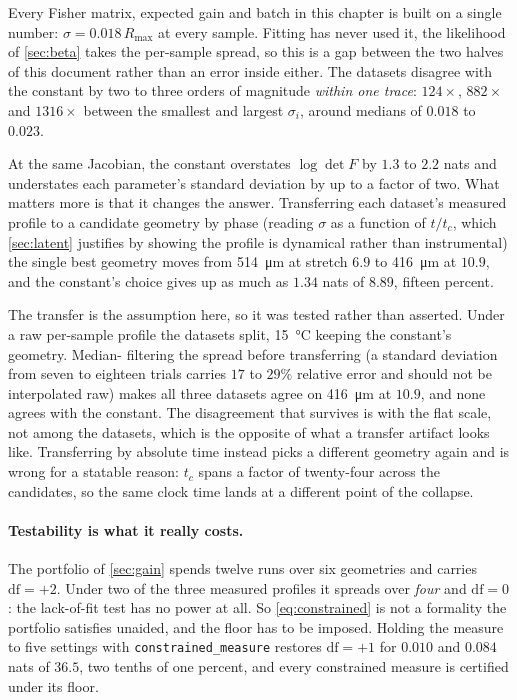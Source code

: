 \documentclass[10pt]{article}
\begin{document}
Every Fisher matrix, expected gain and batch in this chapter is built on a single number:
$\sigma = 0.018\,R_{\max}$ at every sample. Fitting has never used it, the likelihood of
\cref{sec:beta} takes the per-sample spread, so this is a gap between the two halves of this
document rather than an error inside either. The datasets disagree with the constant by two to
three orders of magnitude \emph{within one trace}: $124\times$, $882\times$ and $1316\times$
between the smallest and largest $\sigma_i$, around medians of $0.018$ to $0.023$.

At the same Jacobian, the constant overstates $\log\det F$ by $1.3$ to $2.2$ nats and understates
each parameter's standard deviation by up to a factor of two. What matters more is that it
changes the answer. Transferring each dataset's measured profile to a candidate geometry by phase (reading $\sigma$ as a function of $t/t_c$, which \cref{sec:latent} justifies by showing the
profile is dynamical rather than instrumental) the single best geometry moves from
\SI{514}{\micro\metre} at stretch $6.9$ to \SI{416}{\micro\metre} at $10.9$, and the constant's
choice gives up as much as $1.34$ nats of $8.89$, fifteen percent.

The transfer is the assumption here, so it was tested rather than asserted. Under a raw
per-sample profile the datasets split, \SI{15}{\celsius} keeping the constant's geometry. Median-
filtering the spread before transferring (a standard deviation from seven to eighteen trials
carries $17$ to $29\%$ relative error and should not be interpolated raw) makes all three
datasets agree on \SI{416}{\micro\metre} at $10.9$, and none agrees with the constant. The
disagreement that survives is with the flat scale, not among the datasets, which is the opposite
of what a transfer artifact looks like. Transferring by absolute time instead picks a different
geometry again and is wrong for a statable reason: $t_c$ spans a factor of twenty-four across
the candidates, so the same clock time lands at a different point of the collapse.

\paragraph{Testability is what it really costs.}
The portfolio of \cref{sec:gain} spends twelve runs over six geometries and carries
$\mathrm{df} = +2$. Under two of the three measured profiles it spreads over \emph{four} and
$\mathrm{df} = 0$: the lack-of-fit test has no power at all. So \eqref{eq:constrained} is not a
formality the portfolio satisfies unaided, and the floor has to be imposed. Holding the measure
to five settings with \texttt{constrained\_measure} restores $\mathrm{df} = +1$ for $0.010$ and
$0.084$ nats of $36.5$, two tenths of one percent, and every constrained measure is
certified under its floor.
\end{document}
